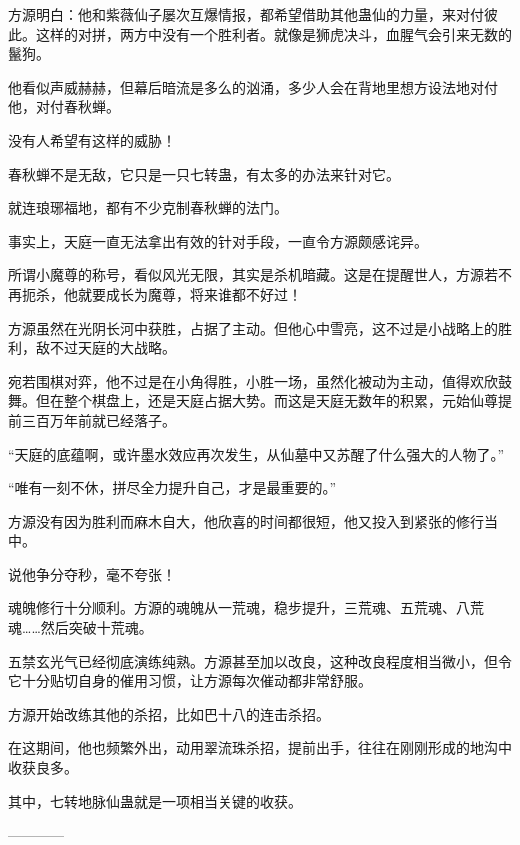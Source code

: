 \begin{this_body}
方源明白：他和紫薇仙子屡次互爆情报，都希望借助其他蛊仙的力量，来对付彼此。这样的对拼，两方中没有一个胜利者。就像是狮虎决斗，血腥气会引来无数的鬣狗。

他看似声威赫赫，但幕后暗流是多么的汹涌，多少人会在背地里想方设法地对付他，对付春秋蝉。

没有人希望有这样的威胁！

春秋蝉不是无敌，它只是一只七转蛊，有太多的办法来针对它。

就连琅琊福地，都有不少克制春秋蝉的法门。

事实上，天庭一直无法拿出有效的针对手段，一直令方源颇感诧异。

所谓小魔尊的称号，看似风光无限，其实是杀机暗藏。这是在提醒世人，方源若不再扼杀，他就要成长为魔尊，将来谁都不好过！

方源虽然在光阴长河中获胜，占据了主动。但他心中雪亮，这不过是小战略上的胜利，敌不过天庭的大战略。

宛若围棋对弈，他不过是在小角得胜，小胜一场，虽然化被动为主动，值得欢欣鼓舞。但在整个棋盘上，还是天庭占据大势。而这是天庭无数年的积累，元始仙尊提前三百万年前就已经落子。

“天庭的底蕴啊，或许墨水效应再次发生，从仙墓中又苏醒了什么强大的人物了。”

“唯有一刻不休，拼尽全力提升自己，才是最重要的。”

方源没有因为胜利而麻木自大，他欣喜的时间都很短，他又投入到紧张的修行当中。

说他争分夺秒，毫不夸张！

魂魄修行十分顺利。方源的魂魄从一荒魂，稳步提升，三荒魂、五荒魂、八荒魂……然后突破十荒魂。

五禁玄光气已经彻底演练纯熟。方源甚至加以改良，这种改良程度相当微小，但令它十分贴切自身的催用习惯，让方源每次催动都非常舒服。

方源开始改练其他的杀招，比如巴十八的连击杀招。

在这期间，他也频繁外出，动用翠流珠杀招，提前出手，往往在刚刚形成的地沟中收获良多。

其中，七转地脉仙蛊就是一项相当关键的收获。

------------

\end{this_body}


